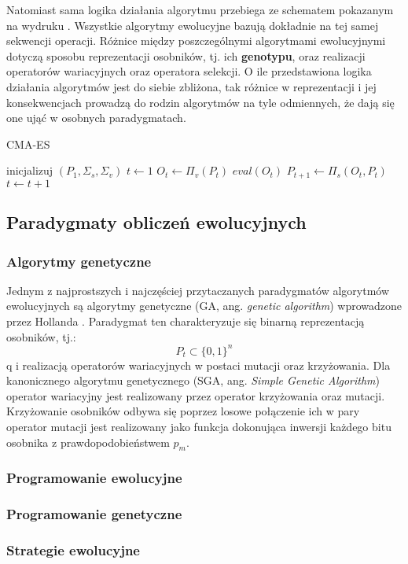 Natomiast sama logika działania algorytmu przebiega ze schematem pokazanym na wydruku \source. Wszystkie algorytmy ewolucyjne bazują dokładnie na tej samej sekwencji operacji. Różnice między poszczególnymi algorytmami ewolucyjnymi dotyczą sposobu reprezentacji osobników, tj. ich \textbf{genotypu}, oraz realizacji operatorów wariacyjnych oraz operatora selekcji. O ile przedstawiona logika działania algorytmów jest do siebie zbliżona, tak różnice w reprezentacji i jej konsekwencjach prowadzą do rodzin algorytmów na tyle odmiennych, że dają się one ująć w osobnych paradygmatach. 
\begin{algorithm}[h]
\caption{CMA-ES}
\label{alg-evol}
\begin{algorithmic}[1]
\STATE inicjalizuj $(P_1, \Sigma_{s}, \Sigma_{v})$
\STATE $t \gets 1$
    \STATE $O_{t} \gets \Pi_{v}(P_{t})$
    \STATE $eval(O_{t})$
    \STATE $P_{t+1} \gets \Pi_{s}(O_{t}, P_{t})$
    \STATE $t \gets t + 1$
\ENDWHILE
\end{algorithmic}
\end{algorithm}

\subsection{Paradygmaty obliczeń ewolucyjnych}
\subsubsection{Algorytmy genetyczne}
    Jednym z najprostszych i najczęściej przytaczanych paradygmatów algorytmów ewolucyjnych są algorytmy genetyczne (GA, ang. \textit{genetic algorithm}) wprowadzone przez Hollanda \source. Paradygmat ten charakteryzuje się binarną reprezentacją osobników, tj.: 
    \begin{equation*}
        P_{t} \subset \{0, 1\}^{n}
    \end{equation*}q
    i realizacją operatorów wariacyjnych w postaci mutacji oraz krzyżowania. Dla kanonicznego algorytmu genetycznego (SGA, ang. \textit{Simple Genetic Algorithm})
    operator wariacyjny jest realizowany przez operator krzyżowania oraz mutacji.
    Krzyżowanie osobników odbywa się poprzez losowe połączenie ich w pary 
    operator mutacji jest realizowany jako funkcja dokonująca inwersji każdego bitu osobnika z prawdopodobieństwem $p_m$.  
\subsubsection{Programowanie ewolucyjne}
\subsubsection{Programowanie genetyczne}
\subsubsection{Strategie ewolucyjne}

